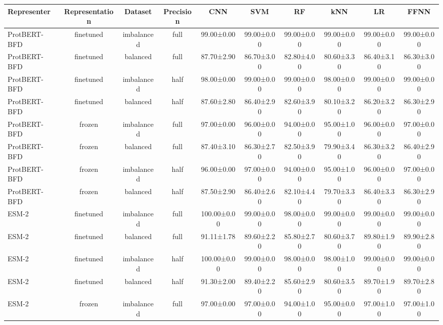 \begin{tabular}{lccccccccc}
\toprule
 \textbf{Representer} & \textbf{Representation} &    \textbf{Dataset} & \textbf{Precision} &         \textbf{CNN} &         \textbf{SVM} &          \textbf{RF} &         \textbf{kNN} &          \textbf{LR} &        \textbf{FFNN} \\
\midrule
ProtBERT-BFD &      finetuned & imbalanced &      full &  99.00±0.00 &  99.00±0.00 &  99.00±0.00 &  99.00±0.00 &  99.00±0.00 &  99.00±0.00 \\
ProtBERT-BFD &      finetuned &   balanced &      full &  87.70±2.90 &  86.70±3.00 &  82.80±4.00 &  80.60±3.30 &  86.40±3.10 &  86.30±3.00 \\
ProtBERT-BFD &      finetuned & imbalanced &      half &  98.00±0.00 &  99.00±0.00 &  99.00±0.00 &  98.00±0.00 &  99.00±0.00 &  99.00±0.00 \\
ProtBERT-BFD &      finetuned &   balanced &      half &  87.60±2.80 &  86.40±2.90 &  82.60±3.90 &  80.10±3.20 &  86.20±3.20 &  86.30±2.90 \\
ProtBERT-BFD &         frozen & imbalanced &      full &  97.00±0.00 &  96.00±0.00 &  94.00±0.00 &  95.00±1.00 &  96.00±0.00 &  97.00±0.00 \\
ProtBERT-BFD &         frozen &   balanced &      full &  87.40±3.10 &  86.30±2.70 &  82.50±3.90 &  79.90±3.40 &  86.30±3.20 &  86.40±2.90 \\
ProtBERT-BFD &         frozen & imbalanced &      half &  96.00±0.00 &  97.00±0.00 &  94.00±0.00 &  95.00±1.00 &  96.00±0.00 &  97.00±0.00 \\
ProtBERT-BFD &         frozen &   balanced &      half &  87.50±2.90 &  86.40±2.60 &  82.10±4.40 &  79.70±3.30 &  86.40±3.30 &  86.30±2.90 \\
       ESM-2 &      finetuned & imbalanced &      full & 100.00±0.00 &  99.00±0.00 &  98.00±0.00 &  99.00±0.00 &  99.00±0.00 &  99.00±0.00 \\
       ESM-2 &      finetuned &   balanced &      full &  91.11±1.78 &  89.60±2.20 &  85.80±2.70 &  80.60±3.70 &  89.80±1.90 &  89.90±2.80 \\
       ESM-2 &      finetuned & imbalanced &      half & 100.00±0.00 &  99.00±0.00 &  98.00±0.00 &  98.00±1.00 &  99.00±0.00 &  99.00±0.00 \\
       ESM-2 &      finetuned &   balanced &      half &  91.30±2.00 &  89.40±2.20 &  85.60±2.90 &  80.60±3.50 &  89.70±1.90 &  89.70±2.80 \\
       ESM-2 &         frozen & imbalanced &      full &  97.00±0.00 &  97.00±0.00 &  94.00±1.00 &  95.00±0.00 &  97.00±1.00 &  97.00±1.00 \\

\end{tabular}

